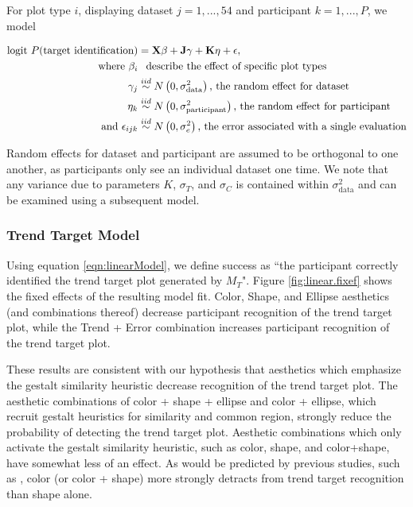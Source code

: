 \documentclass[11pt]{isuthesis}\usepackage[]{graphicx}\usepackage[]{color}
\begin{document}
For plot type $i$, displaying dataset $j=1, ..., 54$ and participant $k=1, ..., P$, we model

\begin{align}
\text{logit }P(\text{target identification}) & =  \textbf{X}\beta + \textbf{J}\gamma + \textbf{K}\eta + \epsilon, \label{eqn:linearModel}\\
\text{where } \beta_i & \hphantom{\sim} \text{describe the effect of specific plot types}\nonumber\\
\hphantom{where } \gamma_j & \overset{iid}{\sim} N\left(0, \sigma^2_{\text{data}}\right)\text{, the random effect for dataset}\nonumber\\
\hphantom{where } \eta_k & \overset{iid}{\sim} N\left(0, \sigma^2_{\text{participant}}\right)\text{, the random effect for participant}\nonumber\\
\text{and } \epsilon_{ijk} & \overset{iid}{\sim}  N\left(0, \sigma^2_e\right)\text{, the error associated with a single evaluation} \nonumber
\end{align}

Random effects for dataset and participant are assumed to be orthogonal to one another, as participants only see an individual dataset one time. We note that any variance due to parameters $K$, $\sigma_T$, and $\sigma_C$ is contained within $\sigma^2_{\text{data}}$ and can be examined using a subsequent model. 

\subsubsection{Trend Target Model}



Using equation \ref{eqn:linearModel}, we define success as ``the participant correctly identified the trend target plot generated by $M_T$". Figure \ref{fig:linear.fixef} shows the fixed effects of the resulting model fit. Color, Shape, and Ellipse aesthetics (and combinations thereof) decrease participant recognition of the trend target plot, while the Trend + Error combination increases participant recognition of the trend target plot.

These results are consistent with our hypothesis that aesthetics which emphasize the gestalt similarity heuristic decrease recognition of the trend target plot. The aesthetic combinations of color + shape + ellipse and color + ellipse, which recruit gestalt heuristics for similarity and common region, strongly reduce the probability of detecting the trend target plot. Aesthetic combinations which only activate the gestalt similarity heuristic, such as color, shape, and color+shape, have somewhat less of an effect. As would be predicted by previous studies, such as \citet{lewandowsky1989discriminating}, color (or color + shape) more strongly detracts from trend target recognition than shape alone. 
\end{document}
